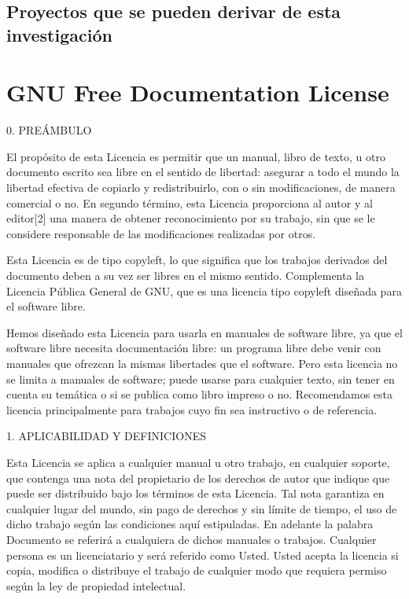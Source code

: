 \documentclass[a4paper, 11pt, oneside]{report}
\begin{document}
\section{Proyectos que se pueden derivar de esta investigación}

\chapter{GNU Free Documentation License}

0. PREÁMBULO

El propósito de esta Licencia es permitir que un manual, libro de texto, u otro documento escrito sea libre en el sentido de libertad: asegurar a todo el mundo la libertad efectiva de copiarlo y redistribuirlo, con o sin modificaciones, de manera comercial o no. En segundo término, esta Licencia proporciona al autor y al editor[2] una manera de obtener reconocimiento por su trabajo, sin que se le considere responsable de las modificaciones realizadas por otros.

Esta Licencia es de tipo copyleft, lo que significa que los trabajos derivados del documento deben a su vez ser libres en el mismo sentido. Complementa la Licencia Pública General de GNU, que es una licencia tipo copyleft diseñada para el software libre.

Hemos diseñado esta Licencia para usarla en manuales de software libre, ya que el software libre necesita documentación libre: un programa libre debe venir con manuales que ofrezcan la mismas libertades que el software. Pero esta licencia no se limita a manuales de software; puede usarse para cualquier texto, sin tener en cuenta su temática o si se publica como libro impreso o no. Recomendamos esta licencia principalmente para trabajos cuyo fin sea instructivo o de referencia.

1. APLICABILIDAD Y DEFINICIONES

Esta Licencia se aplica a cualquier manual u otro trabajo, en cualquier soporte, que contenga una nota del propietario de los derechos de autor que indique que puede ser distribuido bajo los términos de esta Licencia. Tal nota garantiza en cualquier lugar del mundo, sin pago de derechos y sin límite de tiempo, el uso de dicho trabajo según las condiciones aquí estipuladas. En adelante la palabra Documento se referirá a cualquiera de dichos manuales o trabajos. Cualquier persona es un licenciatario y será referido como Usted. Usted acepta la licencia si copia, modifica o distribuye el trabajo de cualquier modo que requiera permiso según la ley de propiedad intelectual.
\end{document}
